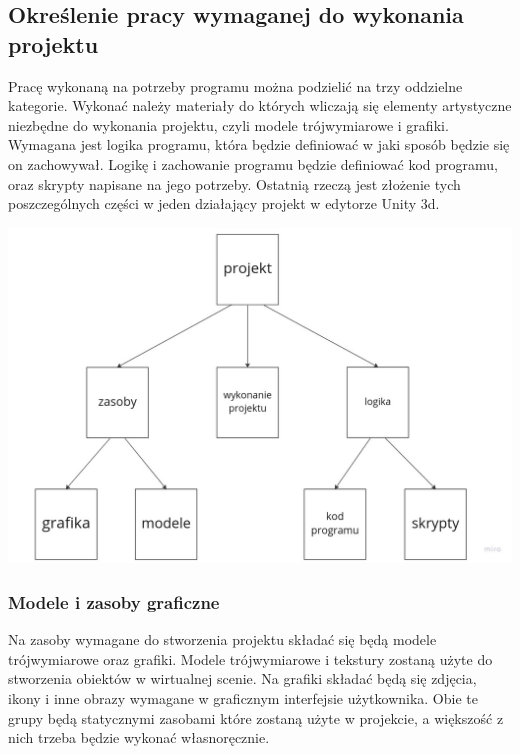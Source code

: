 \documentclass{article} %
\begin{document}
    \subsection{Określenie pracy wymaganej do wykonania projektu}
        Pracę wykonaną na potrzeby programu można podzielić na trzy oddzielne kategorie. Wykonać należy materiały do których wliczają się elementy artystyczne niezbędne do wykonania projektu, czyli modele trójwymiarowe i grafiki. Wymagana jest logika programu, która będzie definiować w jaki sposób będzie się on zachowywał. Logikę i zachowanie programu będzie definiować kod programu, oraz skrypty napisane na jego potrzeby. Ostatnią rzeczą jest złożenie tych poszczególnych części w jeden działający projekt w edytorze Unity 3d.
        \\
        
        \begin{center}
            \includegraphics[scale=0.3,keepaspectratio]{images/diagrams/1 Project work categories.jpg}
        \end{center}


        \subsubsection{Modele i zasoby graficzne}
            Na zasoby wymagane do stworzenia projektu składać się będą modele trójwymiarowe oraz grafiki. Modele trójwymiarowe i tekstury zostaną użyte do stworzenia obiektów w wirtualnej scenie. Na grafiki składać będą się zdjęcia, ikony i inne obrazy wymagane w graficznym interfejsie użytkownika. Obie te grupy będą statycznymi zasobami które zostaną użyte w projekcie, a większość z nich trzeba będzie wykonać własnoręcznie.
            \\
        
\end{document}
